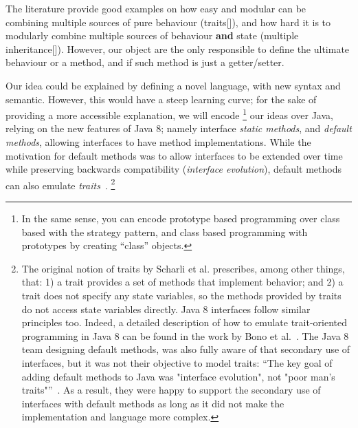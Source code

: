   The literature provide good examples on how easy and modular can be combining
  multiple sources of pure behaviour (traits[]), and how
  hard it is to modularly combine multiple sources of behaviour \textbf{and} state (multiple inheritance[]).
  However, our object are the only responsible to define 
  the ultimate behaviour or a method, and if such method is just a getter/setter.

Our idea could be explained by defining a novel language, with new syntax and semantic.
However, this would have a
steep learning curve; for the sake of providing a more accessible explanation, we will encode
\footnote{
In the same sense, you can encode prototype based programming over class based with
the strategy pattern, and class based programming with prototypes by creating ``class'' objects.
} our ideas
over Java, relying on the new features of Java 8; namely
interface \emph{static methods}, and \emph{default methods}, allowing interfaces to have
method implementations. While the motivation for default methods was
to allow interfaces to be extended over time while preserving backwards
compatibility (\emph{interface evolution}),
 default methods can also emulate \emph{traits}~\cite{scharli03traits}.
\footnote{The
original notion of traits by Scharli et al. prescribes, among other
things, that: 1) a trait provides a set of methods that implement
behavior; and 2) a trait does not specify any state variables, so the
methods provided by traits do not access state variables
directly. Java 8 interfaces follow similar principles too. Indeed, a
detailed description of how to emulate trait-oriented programming in
Java 8 can be found in the work by Bono et al.~\cite{bono14}. The Java 8
team designing default methods, was also fully aware of that secondary
use of interfaces, but it was not their objective to model traits:
``The key goal of adding default methods to Java was "interface
evolution", not "poor man's traits"''~\cite{goetz13default}. As a result, 
they were happy to support the secondary use of interfaces with
default methods as long as it did not make the implementation and
language more complex.}




